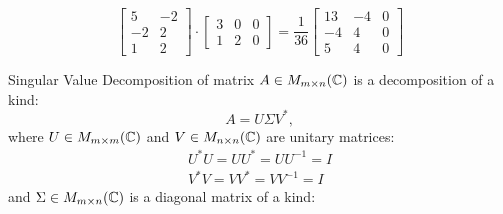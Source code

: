 \begin{solution}
\[\begin{bmatrix}
            5 & -2 \\
            -2 & 2\\
            1 & 2
        \end{bmatrix} \cdot \begin{bmatrix}
            3 & 0 & 0\\
            1 & 2 & 0
        \end{bmatrix} = \dfrac{1}{36} \begin{bmatrix}
            13 & -4 & 0\\
            -4 & 4 & 0\\
            5 & 4 & 0
        \end{bmatrix}
    \]
\end{solution}

    Singular Value Decomposition of matrix $A\in M_{m\times n}(\mathbb{C})$ is a decomposition of a kind:
    \[
        A = U\Sigma V^*,  
    \]
    where $U \in M_{m\times m}(\mathbb{C})$ and $V \in M_{n\times n}(\mathbb{C})$ are unitary matrices:
    \begin{gather*}
        U^*U = UU^*=UU^{-1} = I\\
        V^*V = VV^*=VV^{-1} = I
    \end{gather*}
    and $\Sigma \in M_{m\times n}(\mathbb{C})$ is a diagonal matrix of a kind:
